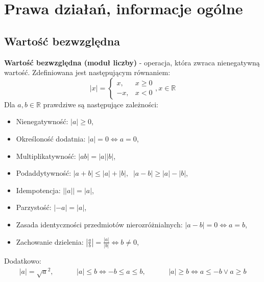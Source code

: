\documentclass[14pt,a4paper]{extarticle}
\begin{document}
\newpage
\renewcommand{\arraystretch}{1.2}
\setlength{\arrayrulewidth}{0.5mm}

\section{Prawa działań, informacje ogólne}
\subsection{Wartość bezwzględna}
\textbf{Wartość bezwzględna (moduł liczby)} - operacja, która zwraca nienegatywną wartość. Zdefiniowana jest następującym równaniem:
\begin{equation*}
\lvert x \rvert = \left\{
   \begin{array}{ll}
      x, & x \geq 0 \\
      -x, & x < 0
   \end{array}
\right., x \in \mathbb{R}
\end{equation*}
Dla $a, b \in \mathbb{R}$ prawdziwe są następujące zależności:
\begin{itemize}
   \item Nienegatywność: $\lvert a\rvert \geq 0$,
   \item Określoność dodatnia: $\lvert a \rvert = 0 \Leftrightarrow a = 0$,
   \item Multiplikatywność: $\lvert ab\rvert = \lvert a\rvert\lvert b\rvert$,
   \item Podaddytywność: $\lvert a + b\rvert \leq \lvert a\rvert + \lvert b \rvert,\;\; \lvert a - b\rvert \geq \lvert a\rvert - \lvert b \rvert$,
   \item Idempotencja: $\lvert\lvert a \rvert\rvert = \lvert a \rvert$,
   \item Parzystość: $\lvert -a\rvert = \lvert a\rvert$,
   \item Zasada identyczności przedmiotów nierozróżnialnych: $\lvert a - b \rvert = 0 \Leftrightarrow a = b$,
   \item Zachowanie dzielenia: $\left\lvert\frac{\displaystyle a}{\displaystyle b}\right\rvert = \frac{\displaystyle \lvert a\rvert}{\displaystyle \lvert b \rvert} \Leftrightarrow b \neq 0$,
\end{itemize}
Dodatkowo:
\begin{equation*}
\begin{array}{ccc}
   \lvert a\rvert = \sqrt{a}^{2}, &\hspace{1cm} \lvert a \rvert \leq b \Leftrightarrow -b \leq a \leq b, &\hspace{1cm} \lvert a \rvert \geq b \Leftrightarrow a \leq -b \lor a \geq b \\
\end{array}
\end{equation*}
\end{document}

